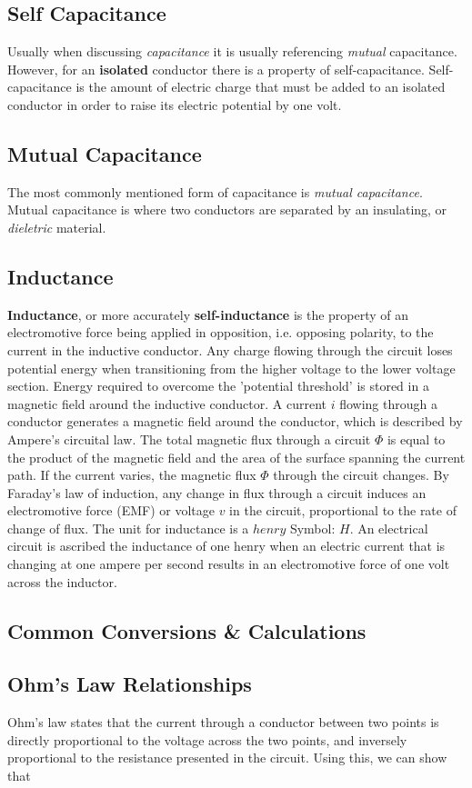\documentclass[11pt,a4paper]{article}
\begin{document}
\subsection*{Self Capacitance}
Usually when discussing \textit{capacitance} it is usually referencing \textit{mutual} capacitance. However, for an \textbf{isolated} conductor there is a property of self-capacitance. Self-capacitance is the amount of electric charge that must be added to an isolated conductor in order to raise its electric potential by one volt.\cite{e7}
\subsection*{Mutual Capacitance}
The most commonly mentioned form of capacitance is \textit{mutual capacitance}. Mutual capacitance is where two conductors are separated by an insulating, or \textit{dieletric} material.
\subsection*{Inductance}
\textbf{Inductance}, or more accurately \textbf{self-inductance} is the property of an electromotive force being applied in opposition, i.e. opposing polarity, to the current in the inductive conductor. Any charge flowing through the circuit loses potential energy when transitioning from the higher voltage to the lower voltage section. Energy required to overcome the 'potential threshold' is stored in a magnetic field around the  inductive conductor. A current $i$ flowing through a conductor generates a magnetic field around the conductor, which is described by Ampere's circuital law. The total magnetic flux through a circuit $\Phi$ is equal to the product of the magnetic field and the area of the surface spanning the current path. If the current varies, the magnetic flux $\Phi$ through the circuit changes. By Faraday's law of induction, any change in flux through a circuit induces an electromotive force (EMF) or voltage $v$ in the circuit, proportional to the rate of change of flux. The unit for inductance is a $henry$ Symbol: $H$. An electrical circuit is ascribed the inductance of one henry when an electric current that is changing at one ampere per second results in an electromotive force of one volt across the inductor.
\subsection{Common Conversions \& Calculations}
\subsection{Ohm's Law Relationships}
Ohm's law states that the current through a conductor between two points is directly proportional to the voltage across the two points, and inversely proportional to the resistance presented in the circuit.\cite{e6}
Using this, we can show that
\end{document}
